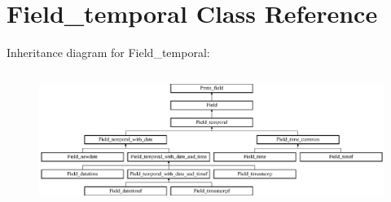 \hypertarget{classField__temporal}{}\section{Field\+\_\+temporal Class Reference}
\label{classField__temporal}
Inheritance diagram for Field\+\_\+temporal\+:\begin{figure}[H]
\begin{center}
\leavevmode
\includegraphics[height=4.375000cm]{classField__temporal}
\end{center}
\end{figure}
